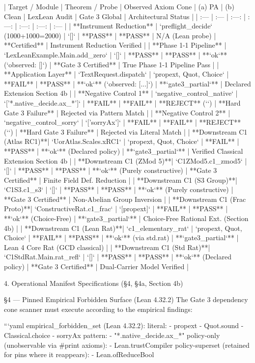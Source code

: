 | Target / Module | Theorem / Probe | Observed Axiom Cone | (a) PA | (b) Clean | LexLean Audit | Gate 3 Global | Architectural Status |
| :--- | :--- | :---: | :---: | :---: | :---: | :--- |
| **Instrument Reduction** | `preflight_decide` (1000+1000=2000) | `[]` | **PASS** | **PASS** | N/A (Lean probe) | **Certified** | Instrument Reduction Verified |
| **Phase 1-1 Pipeline** | `LexLeanExample.Main.add_zero` | `[]` | **PASS** | **PASS** | **`ok`** (`observed: []`) | **Gate 3 Certified** | True Phase 1-1 Pipeline Pass |
| **Application Layer** | `TextRequest.dispatch` | `{propext, Quot, Choice}` | **FAIL** | **PASS** | **`ok`** (`observed: [...]`) | **`gate3_partial`** | Declared Extension Section 4b |
| **Negative Control 1** | `negative_control_native` | `['*.native_decide.ax_*']` | **FAIL** | **FAIL** | **REJECT** (`\noaxioms`) | **Hard Gate 3 Failure** | Rejected via Pattern Match |
| **Negative Control 2** | `negative_control_sorry` | `['sorryAx']` | **FAIL** | **FAIL** | **REJECT** (`\noaxioms`) | **Hard Gate 3 Failure** | Rejected via Literal Match |
| **Downstream C1 (Atlas RC1)**| `UorAtlas.Scales.xRC1` | `{propext, Quot, Choice}` | **FAIL** | **PASS** | **`ok`** (Declared policy) | **`gate3_partial`** | Verified Classical Extension Section 4b |
| **Downstream C1 (ZMod 5)**| `C1ZMod5.c1_zmod5` | `[]` | **PASS** | **PASS** | **`ok`** (Purely constructive) | **Gate 3 Certified** | Finite Field Def. Reduction |
| **Downstream C1 (S3 Group)**| `C1S3.c1_s3` | `[]` | **PASS** | **PASS** | **`ok`** (Purely constructive) | **Gate 3 Certified** | Non-Abelian Group Inversion |
| **Downstream C1 (Frac Proto)**| `ConstructiveRat.c1_frac` | `[propext]` | **FAIL** | **PASS** | **`ok`** (Choice-Free) | **`gate3_partial`** | Choice-Free Rational Ext. (Section 4b) |
| **Downstream C1 (Lean Rat)**| `c1_elementary_rat` | `{propext, Quot, Choice}` | **FAIL** | **PASS** | **`ok`** (via std.rat) | **`gate3_partial`** | Lean 4 Core Rat (GCD classical) |
| **Downstream C1 (Std Rat)**| `C1StdRat.Main.rat_refl` | `[]` | **PASS** | **PASS** | **`ok`** (Declared policy) | **Gate 3 Certified** | Dual-Carrier Model Verified |

4. Operational Manifest Specifications (§4, §4a, Section 4b)

§4 — Pinned Empirical Forbidden Surface (Lean 4.32.2)
The Gate 3 dependency cone scanner must execute according to the empirical findings:

```yaml
empirical_forbidden_set (Lean 4.32.2):
  literal:
    - propext
    - Quot.sound
    - Classical.choice
    - sorryAx
  pattern:
    - "*.native_decide.ax_*"
  policy-only (unobservable via #print axioms):
    - Lean.trustCompiler
  policy-superset (retained for pins where it reappears):
    - Lean.ofReduceBool

